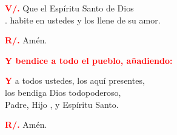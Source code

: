 \documentclass[12pt, letterpaper, spanish]{report}
\begin{document}
\Large \hspace{-0.9cm} {\bfseries \textcolor{red}{V/.}} \hspace{0.5cm} Que el Esp\'iritu Santo de Dios\\
.\hspace{1.5cm} habite en ustedes y los llene de su amor.\newline

\Large \hspace{-0.9cm} {\bfseries \textcolor{red}{R/.}} \hspace{0.5cm} Am\'en.\newline

\large{\bfseries \textcolor{red}{Y bendice a todo el pueblo, a\~nadiendo:}}

\Large \lettrine[lines=1]{\bfseries \textcolor{red}{Y}}{} a todos ustedes, los aqu\'i presentes,\\
los bendiga Dios todopoderoso,\\
Padre, Hijo \Huge{\textcolor{red}{}} \Large, y Esp\'iritu Santo.\newline

\Large \hspace{-0.9cm} {\bfseries \textcolor{red}{R/.}} \hspace{0.5cm} Am\'en.\newline

\end{document}
